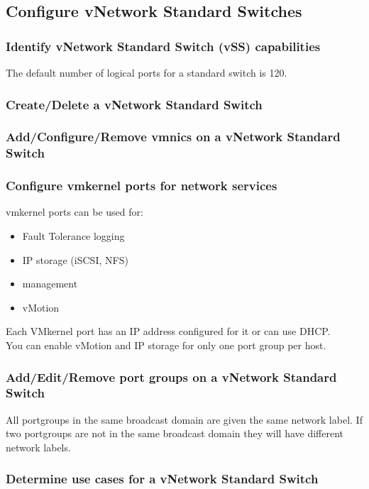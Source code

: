 \subsection{Configure vNetwork Standard Switches}

\subsubsection{Identify vNetwork Standard Switch (vSS) capabilities}

The default number of logical ports for a standard switch is 120.

\subsubsection{Create/Delete a vNetwork Standard Switch}

\subsubsection{Add/Configure/Remove vmnics on a vNetwork Standard Switch}

\subsubsection{Configure vmkernel ports for network services}

vmkernel ports can be used for:

\begin{itemize}
\item Fault Tolerance logging
\item IP storage (iSCSI, NFS)
\item management
\item vMotion
\end{itemize}

Each VMkernel port has an IP address configured for it or can use DHCP.\\

You can enable vMotion and IP storage for only one port group per host.

\subsubsection{Add/Edit/Remove port groups on a vNetwork Standard Switch}

All portgroups in the same broadcast domain are given the same network label.
If two portgroups are not in the same broadcast domain they will have different
network labels.

\subsubsection{Determine use cases for a vNetwork Standard Switch}
